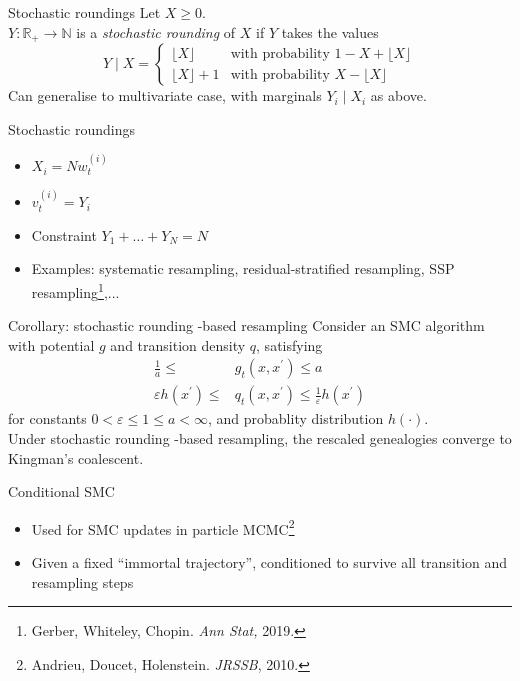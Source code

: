 \documentclass[aspectratio=169]{beamer}
\theoremstyle{definition}
\newcommand{\vt}[2][t]{v_{#1}^{(#2)}}
\newcommand{\wt}[2][t]{w_{#1}^{(#2)}}
\begin{document}
\begin{frame}{Stochastic roundings}
\pause
Let $X\geq 0$.\\
$Y: \mathbb{R}_+ \to \mathbb{N}$ is a \emph{stochastic rounding} of $X$ if $Y$ takes the values
\begin{equation*}
Y \mid X =
\begin{cases}
 \lfloor X \rfloor & \text{with probability } 1- X+ \lfloor X \rfloor \\
  \lfloor X \rfloor +1 & \text{with probability } X- \lfloor X \rfloor 
\end{cases}
\end{equation*}
\pause
Can generalise to multivariate case, with marginals $Y_i \mid X_i$ as above.
\end{frame}

\begin{frame}{Stochastic roundings}
\begin{itemize}
\item $X_i = N\wt{i}$
\item $\vt{i} = Y_i$
\item Constraint $Y_1+\dots +Y_N = N$
\pause
\item Examples: systematic resampling, residual-stratified resampling, SSP resampling\footnote{Gerber, Whiteley, Chopin. \textit{Ann Stat,} 2019.},...
\end{itemize}
\end{frame}

\begin{frame}{Corollary: stochastic rounding -based resampling}
Consider an SMC algorithm with potential $g$ and transition density $q$, satisfying
\begin{align*}
\frac{1}{a} \leq &g_t(x, x^\prime) \leq a \\
\varepsilon h(x^\prime) \leq &q_t(x, x^\prime) \leq \frac{1}{\varepsilon} h(x^\prime) 
\end{align*}
for constants $0<\varepsilon\leq 1\leq a<\infty$, and probablity distribution $h(\cdot)$.\\[10pt]

Under stochastic rounding -based resampling, the rescaled genealogies converge to Kingman's coalescent.
\end{frame}

\begin{frame}{Conditional SMC}
\begin{itemize}
\item Used for SMC updates in particle MCMC\footnote{Andrieu, Doucet, Holenstein. \textit{JRSSB}, 2010.}
\item Given a fixed ``immortal trajectory'', conditioned to survive all transition and resampling steps
\end{itemize}
\end{frame}
\end{document}
